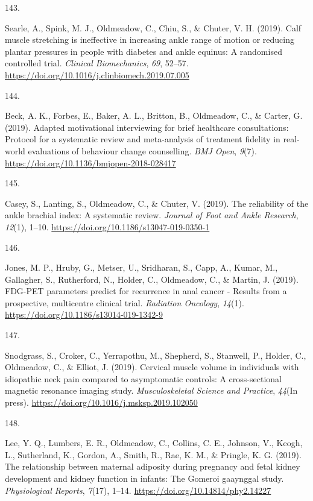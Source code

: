 \documentclass[11pt, a4paper]{awesome-cv}
\newlength{\csllabelwidth}
\newcommand{\CSLLeftMargin}[1]{\parbox[t]{\csllabelwidth}{#1}}
\newcommand{\CSLRightInline}[1]{\parbox[t]{\linewidth - \csllabelwidth}{#1}}
\begin{document}
\leavevmode\hypertarget{ref-searle_calf_2019}{}%
\CSLLeftMargin{143. }
\CSLRightInline{Searle, A., Spink, M. J., Oldmeadow, C., Chiu, S., \&
Chuter, V. H. (2019). Calf muscle stretching is ineffective in
increasing ankle range of motion or reducing plantar pressures in people
with diabetes and ankle equinus: A randomised controlled trial.
\emph{Clinical Biomechanics}, \emph{69}, 52--57.
\url{https://doi.org/10.1016/j.clinbiomech.2019.07.005}}

\leavevmode\hypertarget{ref-beck_adapted_2019}{}%
\CSLLeftMargin{144. }
\CSLRightInline{Beck, A. K., Forbes, E., Baker, A. L., Britton, B.,
Oldmeadow, C., \& Carter, G. (2019). Adapted motivational interviewing
for brief healthcare consultations: Protocol for a systematic review and
meta-analysis of treatment fidelity in real-world evaluations of
behaviour change counselling. \emph{BMJ Open}, \emph{9}(7).
\url{https://doi.org/10.1136/bmjopen-2018-028417}}

\leavevmode\hypertarget{ref-casey_reliability_2019}{}%
\CSLLeftMargin{145. }
\CSLRightInline{Casey, S., Lanting, S., Oldmeadow, C., \& Chuter, V.
(2019). The reliability of the ankle brachial index: A systematic
review. \emph{Journal of Foot and Ankle Research}, \emph{12}(1), 1--10.
\url{https://doi.org/10.1186/s13047-019-0350-1}}

\leavevmode\hypertarget{ref-jones_fdg-pet_2019}{}%
\CSLLeftMargin{146. }
\CSLRightInline{Jones, M. P., Hruby, G., Metser, U., Sridharan, S.,
Capp, A., Kumar, M., Gallagher, S., Rutherford, N., Holder, C.,
Oldmeadow, C., \& Martin, J. (2019). FDG-PET parameters predict for
recurrence in anal cancer - Results from a prospective, multicentre
clinical trial. \emph{Radiation Oncology}, \emph{14}(1).
\url{https://doi.org/10.1186/s13014-019-1342-9}}

\leavevmode\hypertarget{ref-snodgrass_cervical_2019}{}%
\CSLLeftMargin{147. }
\CSLRightInline{Snodgrass, S., Croker, C., Yerrapothu, M., Shepherd, S.,
Stanwell, P., Holder, C., Oldmeadow, C., \& Elliot, J. (2019). Cervical
muscle volume in individuals with idiopathic neck pain compared to
asymptomatic controls: A cross-sectional magnetic resonance imaging
study. \emph{Musculoskeletal Science and Practice}, \emph{44}(In press).
\url{https://doi.org/10.1016/j.msksp.2019.102050}}

\leavevmode\hypertarget{ref-lee_relationship_2019}{}%
\CSLLeftMargin{148. }
\CSLRightInline{Lee, Y. Q., Lumbers, E. R., Oldmeadow, C., Collins, C.
E., Johnson, V., Keogh, L., Sutherland, K., Gordon, A., Smith, R., Rae,
K. M., \& Pringle, K. G. (2019). The relationship between maternal
adiposity during pregnancy and fetal kidney development and kidney
function in infants: The Gomeroi gaaynggal study. \emph{Physiological
Reports}, \emph{7}(17), 1--14.
\url{https://doi.org/10.14814/phy2.14227}}
\end{document}

